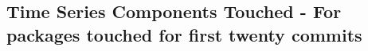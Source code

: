 \subsection{Time Series Components Touched - \label{subsec:codebase_graph_latex.repository_graph.component_time_series.time_series_components_touched_packages_first twenty commits} 
For packages touched for first twenty commits} 


\clearpage
